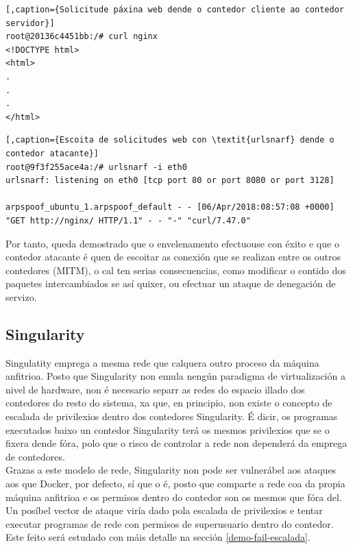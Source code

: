 \begin{enumerate}
\begin{lstlisting}[,caption={Solicitude páxina web dende o contedor cliente ao contedor servidor}]
root@20136c4451bb:/# curl nginx
<!DOCTYPE html>
<html>
.
.
.
</html>
\end{lstlisting}

\begin{lstlisting}[,caption={Escoita de solicitudes web con \textit{urlsnarf} dende o contedor atacante}]
root@9f3f255ace4a:/# urlsnarf -i eth0
urlsnarf: listening on eth0 [tcp port 80 or port 8080 or port 3128]

arpspoof_ubuntu_1.arpspoof_default - - [06/Apr/2018:08:57:08 +0000] "GET http://nginx/ HTTP/1.1" - - "-" "curl/7.47.0"
\end{lstlisting}

Por tanto, queda demostrado que o envelenamento efectuouse con éxito e que o contedor atacante é quen de escoitar as conexión que se realizan entre os outros contedores (MITM), o cal ten serias consecuencias, como modificar o contido dos paquetes intercambiados se así quixer, ou efectuar un ataque de denegación de servizo.

\end{enumerate}

\subsection{Singularity}


Singulatity emprega a mesma rede que calquera outro proceso da máquina anfitrioa. Posto que Singularity non emula nengún paradigma de virtualización a nivel de hardware, non é necesario separr as redes do espacio illado dos contedores do resto do sistema, xa que, en principio, non existe o concepto de escalada de privilexios dentro dos contedores Singularity. É dicir, os programas executados baixo un contedor Singularity terá os mesmos privilexios que se o fixera dende fóra, polo que o risco de controlar a rede non dependerá da emprega de contedores. \cite{SingularityHPC} \\

Grazas a este modelo de rede, Singularity non pode ser vulnerábel aos ataques aos que Docker, por defecto, sí que o é, posto que comparte a rede coa da propia máquina anfitrioa e os permisos dentro do contedor son os mesmos que fóra del.\\

Un posíbel vector de ataque viría dado pola escalada de privilexios e tentar executar programas de rede con permisos de superusuario dentro do contedor. Este feito será estudado con máis detalle na sección \ref{demo-fail-escalada}.

